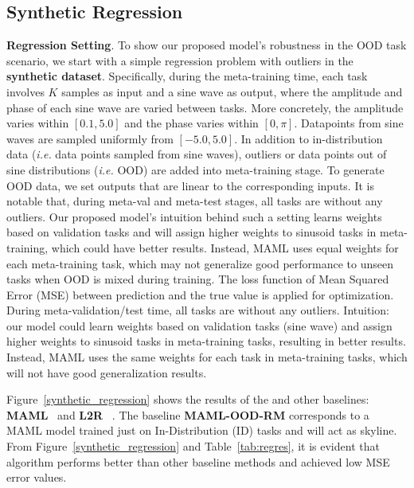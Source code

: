\subsection{Synthetic Regression}
\textbf{Regression Setting}. To show our proposed model's robustness in the OOD task scenario, we start with a simple regression problem with outliers in the \textbf{synthetic dataset}. Specifically, during the meta-training time, each task involves $K$ samples as input and a sine wave as output, where the amplitude and phase of each sine wave are varied between tasks. More concretely, the amplitude varies within $[0.1, 5.0]$ and the phase varies within $[0, \pi]$. Datapoints from sine waves are sampled uniformly from $[-5.0, 5.0]$. In addition to in-distribution data (\textit{i.e.} data points sampled from sine waves), outliers or data points out of sine distributions (\textit{i.e.} OOD) are added into meta-training stage. To generate OOD data, we set outputs that are linear to the corresponding inputs. It is notable that, during meta-val and meta-test stages, all tasks are without any outliers. Our proposed model's intuition behind such a setting learns weights based on validation tasks and will assign higher weights to sinusoid tasks in meta-training, which could have better results. Instead, MAML uses equal weights for each meta-training task, which may not generalize good performance to unseen tasks when OOD is mixed during training. The loss function of Mean Squared Error (MSE) between prediction and the true value is applied for optimization. During meta-validation/test time, all tasks are without any outliers. Intuition: our model could learn weights based on validation tasks (sine wave) and assign higher weights to sinusoid tasks in meta-training tasks, resulting in better results. Instead, MAML uses the same weights for each task in meta-training tasks, which will not have good generalization results. 

Figure~\ref{synthetic_regression} shows the results of the \sysname{} and other baselines: \textbf{MAML}~\citep{finn2017model} and \textbf{L2R} ~\citep{ren2018learning}. The baseline \textbf{MAML-OOD-RM} corresponds to a MAML model trained just on In-Distribution (ID) tasks and will act as skyline. From Figure~\ref{synthetic_regression} and Table~\ref{tab:regres}, it is evident that \sysname{} algorithm performs better than other baseline methods and achieved low MSE error values.


